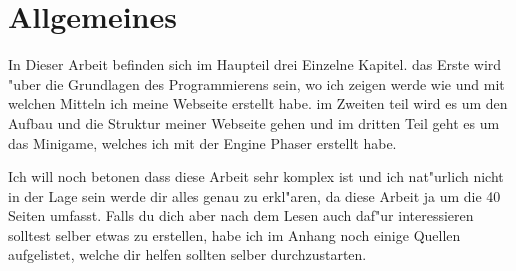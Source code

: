 \documentclass{article}
\begin{document}





\cleardoublepage


\section{Allgemeines}
In Dieser Arbeit befinden sich im Haupteil drei Einzelne Kapitel.
das Erste wird "uber die Grundlagen des Programmierens sein, wo ich zeigen werde wie und mit welchen Mitteln ich meine Webseite erstellt habe.
im Zweiten teil wird es um den Aufbau und die Struktur meiner Webseite gehen und im dritten Teil geht es um das Minigame,
welches ich mit der Engine Phaser erstellt habe.

Ich will noch betonen dass diese Arbeit sehr komplex ist und ich nat"urlich nicht in der Lage sein werde dir alles genau zu erkl"aren, da diese Arbeit ja
um die 40 Seiten umfasst. Falls du dich aber nach dem Lesen auch daf"ur interessieren solltest selber etwas zu erstellen, habe ich im Anhang noch einige Quellen
aufgelistet, welche dir helfen sollten selber durchzustarten.
\end{document}
